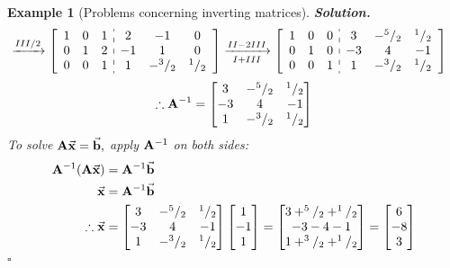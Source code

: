 \documentclass[12pt, a4paper]{article}
\newtheorem{eg}{Example}[subsection]
\newenvironment*{sol}{\par\indent\textbf{\textit{Solution. }}}{\hfill{$\square$}\par}
\def\vecx{\va{x}}
\def\vecb{\va{b}}
\def\matrixA{\vb{A}}
\begin{document}
\begin{eg}[Problems concerning inverting matrices]
\begin{sol}
$$\begin{aligned}
			&\xrightarrow[]{III/2}\left[\begin{array}{c:c}\begin{matrix}1&0&1\\0&1&2\\0&0&1\end{matrix}&\begin{matrix}2&-1&0\\-1&1&0\\1&-^3/_2&^1/_2\end{matrix}\end{array}\right]\xrightarrow[I+III]{II-2III}\left[\begin{array}{c:c}\begin{matrix}1&0&0\\0&1&0\\0&0&1\end{matrix}&\begin{matrix}3&-^5/_2&^1/_2\\-3&4&-1\\1&-^3/_2&^1/_2\end{matrix}\end{array}\right]
		\end{aligned}$$
		\[\therefore\matrixA^{-1}=\begin{bmatrix}3&-^5/_2&^1/_2\\-3&4&-1\\1&-^3/_2&^1/_2\end{bmatrix}\]
		To solve $\matrixA\vecx=\vecb,$ apply $\matrixA^{-1}$ on both sides: 
		$$\begin{aligned}
		\matrixA^{-1}(\matrixA\vecx)&=\matrixA^{-1}\vecb\\
		\vecx&=\matrixA^{-1}\vecb\\
		\therefore\vecx&=\begin{bmatrix}3&-^5/_2&^1/_2\\-3&4&-1\\1&-^3/_2&^1/_2\end{bmatrix}\begin{bmatrix}1\\-1\\1\end{bmatrix}=\begin{bmatrix}3+^5/_2+^1/_2\\-3-4-1\\1+^3/_2+^1/_2\end{bmatrix}=\begin{bmatrix}6\\-8\\3\end{bmatrix}
		\end{aligned}$$
	\end{sol}
\end{eg}
\end{document}
